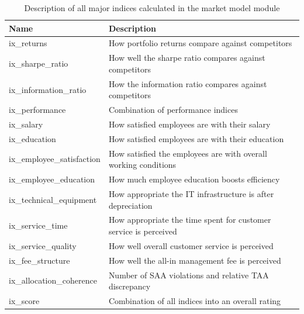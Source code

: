 \begin{table}[h!]
    \begin{tabular}{lp{11cm}}
        \toprule
        Name                       & Description                                                      \\
        \midrule
        ix\_returns                & How portfolio returns compare against competitors                \\
        \midrule
        ix\_sharpe\_ratio          & How well the sharpe ratio compares against competitors           \\
        ix\_information\_ratio     & How the information ratio compares against competitors           \\
        ix\_performance            & Combination of performance indices                               \\
        \midrule
        ix\_salary                 & How satisfied employees are with their salary                    \\
        ix\_education              & How satisfied employees are with their education                 \\
        ix\_employee\_satisfaction & How satisfied the employees are with overall working conditions  \\
        \midrule
        ix\_employee\_education    & How much employee education boosts efficiency                    \\
        ix\_technical\_equipment   & How appropriate the IT infrastructure is after depreciation      \\
        ix\_service\_time          & How appropriate the time spent for customer service is perceived \\
        ix\_service\_quality       & How well overall customer service is perceived                   \\
        \midrule
        ix\_fee\_structure         & How well the all-in management fee is perceived                  \\
        \midrule
        ix\_allocation\_coherence  & Number of SAA violations and relative TAA discrepancy            \\
        \midrule
        ix\_score                  & Combination of all indices into an overall rating                \\
        \bottomrule
    \end{tabular}
    \centering
    \caption{Description of all major indices calculated in the market model module}
    \label{table:market_model_indices}
\end{table}


